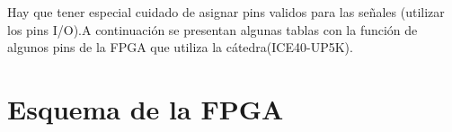 \documentclass{article}
\begin{document}
 Hay que tener especial cuidado de asignar pins validos para las señales (utilizar los pins I/O).A continuación se presentan algunas tablas con la función de algunos pins de la FPGA que utiliza la cátedra(ICE40-UP5K).
 \begin{figure}[H]
 \centering
	\end{figure}
	
\section{Esquema de la FPGA}
\end{document}
